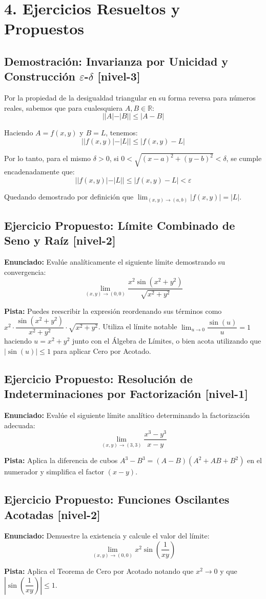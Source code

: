 \documentclass[11pt]{article}
\newenvironment{ejercicios}{%
  \section*{4. Ejercicios Resueltos y Propuestos}%
}{}
\newenvironment{ejerciciodemostracion}[2]{\subsection*{Demostración: #1 \small{[#2]}}}{}
\newenvironment{ejerciciopropuesto}[2]{\subsection*{Ejercicio Propuesto: #1 \small{[#2]}}}{}
\newcommand{\enunciado}[1]{\textbf{Enunciado:} #1\par\vspace{0.2cm}}
\newcommand{\pista}[1]{\textbf{Pista:} #1\par\vspace{0.4cm}}
\begin{document}
\begin{ejercicios}
\begin{ejerciciodemostracion}{Invarianza por Unicidad y Construcción $\varepsilon$-$\delta$}{nivel-3}
{      Por la propiedad de la desigualdad triangular en su forma reversa para números reales, sabemos que para cualesquiera $A, B \in \mathbb{R}$:
      $$ ||A| - |B|| \leq |A - B| $$

      Haciendo $A = f(x,y)$ y $B = L$, tenemos:
      $$ ||f(x,y)| - |L|| \leq |f(x,y) - L| $$

      Por lo tanto, para el mismo $\delta > 0$, si $0 < \sqrt{(x-a)^2 + (y-b)^2} < \delta$, se cumple encadenadamente que:
      $$ ||f(x,y)| - |L|| \leq |f(x,y) - L| < \varepsilon $$

      Quedando demostrado por definición que $\displaystyle \lim_{(x,y) \to (a,b)} |f(x,y)| = |L|$.
    }
  \end{ejerciciodemostracion}

  \begin{ejerciciopropuesto}{Límite Combinado de Seno y Raíz}{nivel-2}
    \enunciado{
      Evalúe analíticamente el siguiente límite demostrando su convergencia:
      $$ \lim_{(x,y) \to (0,0)} \dfrac{x^2 \sin(x^2 + y^2)}{\sqrt{x^2 + y^2}} $$
    }
    \pista{
      Puedes reescribir la expresión reordenando sus términos como $x^2 \cdot \dfrac{\sin(x^2 + y^2)}{x^2 + y^2} \cdot \sqrt{x^2 + y^2}$. Utiliza el límite notable $\displaystyle \lim_{u \to 0} \dfrac{\sin(u)}{u} = 1$ haciendo $u = x^2 + y^2$ junto con el Álgebra de Límites, o bien acota utilizando que $|\sin(u)| \leq 1$ para aplicar Cero por Acotado.
    }
  \end{ejerciciopropuesto}

  \begin{ejerciciopropuesto}{Resolución de Indeterminaciones por Factorización}{nivel-1}
    \enunciado{
      Evalúe el siguiente límite analítico determinando la factorización adecuada:
      $$ \lim_{(x,y) \to (3,3)} \dfrac{x^3 - y^3}{x - y} $$
    }
    \pista{
      Aplica la diferencia de cubos $A^3 - B^3 = (A - B)(A^2 + AB + B^2)$ en el numerador y simplifica el factor $(x-y)$.
    }
  \end{ejerciciopropuesto}

  \begin{ejerciciopropuesto}{Funciones Oscilantes Acotadas}{nivel-2}
    \enunciado{
      Demuestre la existencia y calcule el valor del límite:
      $$ \lim_{(x,y) \to (0,0)} x^2 \sin\left(\dfrac{1}{xy}\right) $$
    }
    \pista{
      Aplica el Teorema de Cero por Acotado notando que $x^2 \to 0$ y que $\left|\sin\left(\dfrac{1}{xy}\right)\right| \leq 1$.
    }
  \end{ejerciciopropuesto}

\end{ejercicios}
\end{document}

